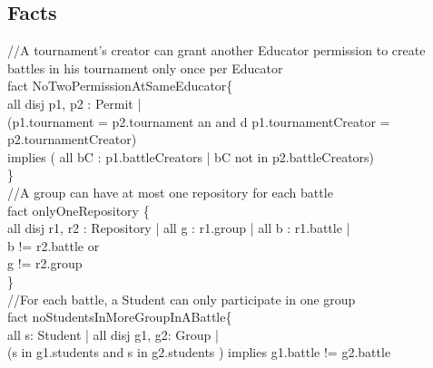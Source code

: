 \documentclass{article}
\begin{document}
{\subsection{Facts}
\color{gray}
//A tournament's creator can grant another Educator permission to create battles in his tournament only once per Educator\\
\color{black}
\color{blue} fact \color{black} NoTwoPermissionAtSameEducator\{\\
\-\hspace{1cm} \color{blue} all disj \color{black} p1, p2 : Permit | \\
\-\hspace{1cm} (p1.tournament \color{blue} = \color{black} p2.tournament an\color{blue} and \color{black}d p1.tournamentCreator \color{blue} = \color{black} p2.tournamentCreator) \\
\-\hspace{1cm} implies (\color{blue} all \color{black} bC : p1.battleCreators | bC \color{blue} not in \color{black} p2.battleCreators)\\
\}
\\
\color{gray}
//A group can have at most one repository for each battle\\
\color{blue} fact \color{black} onlyOneRepository \{\\
\-\hspace{1cm} \color{blue} all disj \color{black} r1, r2 : Repository | \color{blue} all \color{black} g : r1.group | \color{blue} all \color{black} b : r1.battle | \\
\-\hspace{1cm}b \color{blue} != \color{black} r2.battle or \\
\-\hspace{1cm}g \color{blue} != \color{black} r2.group \\
\}
\\
\color{gray}
//For each battle, a Student can only participate in one group\\
\color{black}
\color{blue} fact \color{black} noStudentsInMoreGroupInABattle\{\\
\-\hspace{1cm} \color{blue} all \color{black} s: Student | \color{blue} all disj \color{black} g1, g2: Group | \\
\-\hspace{1cm}(s \color{blue} in \color{black} g1.students \color{blue} and \color{black} s \color{blue} in \color{black} g2.students ) \color{blue} implies \color{black} g1.battle != g2.battle \\
}
\end{document}
